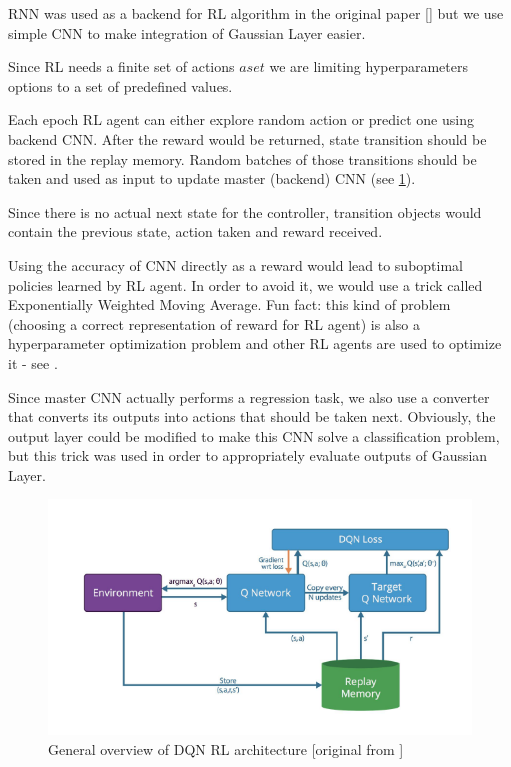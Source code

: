 RNN was used as a backend for RL algorithm in the original paper [\cite{ZophL16}] but we use simple CNN to make integration of Gaussian Layer easier.

Since RL needs a finite set of actions $aset$ we are limiting hyperparameters options to a set of predefined values.

Each epoch RL agent can either explore random action or predict one using backend CNN. After the reward would be returned, state transition should be stored in the replay memory. Random batches of those transitions should be taken and used as input to update master (backend) CNN (see \ref{fig:dqn}).

Since there is no actual next state for the controller, transition objects would contain the previous state, action taken and reward received.

Using the accuracy of CNN directly as a reward would lead to suboptimal policies learned by RL agent. In order to avoid it, we would use a trick called Exponentially Weighted Moving Average. Fun fact: this kind of problem (choosing a correct representation of reward for RL agent) is also a hyperparameter optimization problem and other RL agents are used to optimize it - see \cite{rlhyperparamrl}.

Since master CNN actually performs a regression task, we also use a converter that converts its outputs into actions that should be taken next. Obviously, the output layer could be modified to make this CNN solve a classification problem, but this trick was used in order to appropriately evaluate outputs of Gaussian Layer.

\begin{figure}[!htb]
  \includegraphics[width=\linewidth]{images/dqn.png}
  \caption{General overview of DQN RL architecture [original from \cite{Nair}]}
  \label{fig:dqn}
\end{figure}


